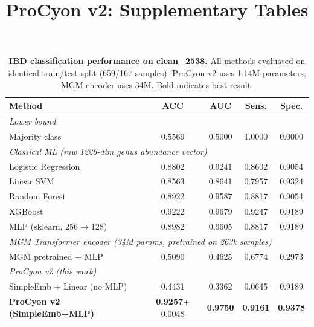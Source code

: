 \documentclass[11pt,a4paper]{article}
\title{ProCyon v2: Supplementary Tables}
\author{}
\date{}
\begin{document}
\maketitle

\begin{table}[ht]
\centering
\caption{\textbf{IBD classification performance on clean\_2538.}
All methods evaluated on identical train/test split (659/167 samples).
ProCyon v2 uses 1.14M parameters; MGM encoder uses 34M.
Bold indicates best result.}
\label{tab:baselines}
\begin{tabular}{lcccc}
\toprule
\textbf{Method} & \textbf{ACC} & \textbf{AUC} & \textbf{Sens.} & \textbf{Spec.} \\
\midrule
\multicolumn{5}{l}{\textit{Lower bound}} \\
\;\; Majority class & 0.5569 & 0.5000 & 1.0000 & 0.0000 \\
\midrule
\multicolumn{5}{l}{\textit{Classical ML (raw 1226-dim genus abundance vector)}} \\
\;\; Logistic Regression & 0.8802 & 0.9241 & 0.8602 & 0.9054 \\
\;\; Linear SVM & 0.8563 & 0.8641 & 0.7957 & 0.9324 \\
\;\; Random Forest & 0.8922 & 0.9587 & 0.8817 & 0.9054 \\
\;\; XGBoost & 0.9222 & 0.9679 & 0.9247 & 0.9189 \\
\;\; MLP (sklearn, 256$\rightarrow$128) & 0.8982 & 0.9605 & 0.8817 & 0.9189 \\
\midrule
\multicolumn{5}{l}{\textit{MGM Transformer encoder (34M params, pretrained on 263k samples)}} \\
\;\; MGM pretrained + MLP & 0.5090 & 0.4625 & 0.6774 & 0.2973 \\
\midrule
\multicolumn{5}{l}{\textit{ProCyon v2 (this work)}} \\
\;\; SimpleEmb + Linear (no MLP) & 0.4431 & 0.3362 & 0.0645 & 0.9189 \\
\;\; \textbf{ProCyon v2 (SimpleEmb+MLP)} & \textbf{0.9257}$\pm$0.0048 & \textbf{0.9750} & \textbf{0.9161} & \textbf{0.9378} \\
\bottomrule
\end{tabular}
\end{table}
\end{document}
